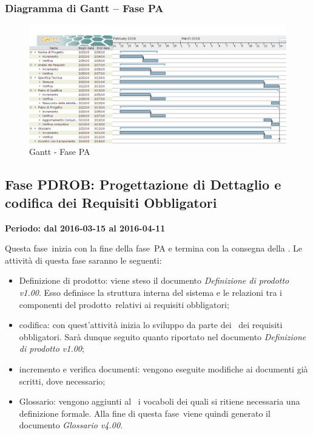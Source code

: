 \documentclass[../PianoProgetto.tex]{subfiles}
\begin{document}
		\subsubsection{Diagramma di Gantt – Fase PA}
			\begin{figure}[!h]
				\centering
				\includegraphics[width=\textwidth]{gantt_png/3-progettazione_architetturale}
				\caption{Gantt - Fase PA}
				\label{fig:Gantt - Fase PA}
			\end{figure}
			
	\subsection{Fase PDROB: Progettazione di Dettaglio e codifica dei Requisiti Obbligatori}
		\textbf{Periodo: dal 2016-03-15 al 2016-04-11}
		
		Questa fase\g\ inizia con la fine della fase\g\ PA e termina con la consegna della \revisionediprogettazione . Le attività di questa fase saranno le seguenti:
		\begin{itemize}
			\item Definizione di prodotto: viene steso il documento \textit{Definizione di prodotto v1.00}. Esso definisce la struttura interna del sistema e le relazioni tra i componenti del prodotto\g\ relativi ai requisiti obbligatori;

			\item codifica: con quest'attività inizia lo sviluppo da parte dei \programmatori\ dei requisiti obbligatori. Sarà dunque seguito quanto riportato nel documento \textit{Definizione di prodotto v1.00};

			\item incremento e verifica documenti: vengono eseguite modifiche ai documenti già scritti, dove necessario;

			\item Glossario: vengono aggiunti al \glossario\ i vocaboli dei quali si ritiene necessaria una definizione formale. Alla fine di questa fase\g\ viene quindi generato il documento \textit{Glossario v4.00}.
		\end{itemize}
\end{document}
